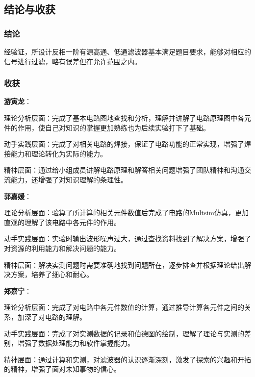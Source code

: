 \documentclass[./测控三级项目.tex]{subfiles} %
\begin{document}
		
		
	\subsection{结论与收获}
	\subsubsection{结论}
	经验证，所设计反相一阶有源高通、低通滤波器基本满足题目要求，能够对相应的信号进行过滤，略有误差但在允许范围之内。
	\subsubsection{收获}
	\textbf{游寅龙}：\par
	理论分析层面：完成了基本电路图地查找和分析，理解并讲解了电路原理图中各元件的作用，使自己对知识的掌握更加熟练也为后续实验打下了基础。\par
	动手实践层面：完成了对相关电路的焊接，保证了电路功能的正常实现，增强了焊接能力和理论转化为实际的能力。\par
	精神层面：通过给小组成员讲解电路原理和解答相关问题增强了团队精神和沟通交流能力，还增强了对知识理解的条理性。\par
	\textbf{郭嘉媛}：\par
	理论分析层面：验算了所计算的相关元件数值后完成了电路的Multsim仿真，更加直观的理解了该电路中各元件的作用。\par
	动手实践层面：实验时输出波形噪声过大，通过查找资料找到了解决方案，增强了对资源的利用能力和解决问题的能力。\par
	精神层面：解决实测问题时需要准确地找到问题所在，逐步排查并根据理论给出解决方案，培养了细心和耐心。\par
	\textbf{郑嘉宁}：\par
	理论分析层面：完成了对电路中各元件数值的计算，通过推导计算各元件之间的关系，加深了对电路的理解。\par
	动手实践层面：完成了对实测数据的记录和伯德图的绘制，理解了理论与实测的差别，增强了数据处理能力和软件掌握能力。\par
	精神层面：通过计算和实测，对滤波器的认识逐渐深刻，激发了探索的兴趣和开拓的精神，增强了面对未知事物的信心。
	
	
	
\end{document}
